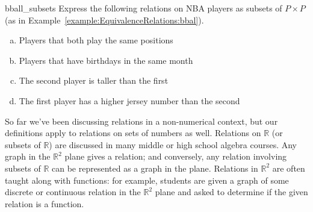 \begin{exercise}{bball_subsets}
Express the following relations on NBA players as subsets of $P \times P$ (as in Example~\ref{example:EquivalenceRelations:bbal}).
\begin{enumerate}[(a)]
\item 
Players that both play the same positions
\item
Players that have birthdays in the same month
\item
The second player is taller than the first
\item
The first player has a higher jersey number than the second
\end{enumerate}
\end{exercise}

So far we've been discussing relations in a non-numerical context, but our definitions apply to relations on sets of numbers as well.  Relations on $\mathbb{R}$ (or subsets of $\mathbb{R}$)  are discussed in many middle or high school algebra courses. Any graph in the $\mathbb{R}^2$ plane gives a relation; and conversely, any relation involving subsets of $\mathbb{R}$ can be represented as a graph in the plane. Relations in $\mathbb{R}^2$ are often taught along with functions: for example, students are given a graph of some discrete or continuous relation in the $\mathbb{R}^2$ plane and asked to determine if the given relation is a function.

